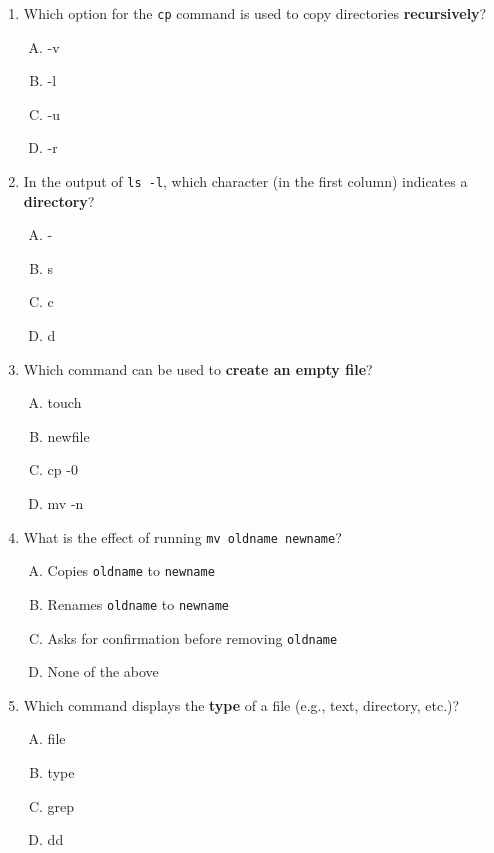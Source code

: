 \documentclass[a4paper]{report}
\begin{document}
\begin{enumerate}[1.]
    \item Which option for the \texttt{cp} command is used to copy directories \textbf{recursively}?  
    \begin{enumerate}[A)]
        \item -v  
        \item -l  
        \item -u  
        \item -r  
    \end{enumerate}

    \item In the output of \texttt{ls -l}, which character (in the first column) indicates a \textbf{directory}?  
    \begin{enumerate}[A)]
        \item -  
        \item s  
        \item c  
        \item d  
    \end{enumerate}

    \item Which command can be used to \textbf{create an empty file}?  
    \begin{enumerate}[A)]
        \item touch  
        \item newfile  
        \item cp -0  
        \item mv -n  
    \end{enumerate}

    \item What is the effect of running \texttt{mv oldname newname}?  
    \begin{enumerate}[A)]
        \item Copies \texttt{oldname} to \texttt{newname}  
        \item Renames \texttt{oldname} to \texttt{newname}  
        \item Asks for confirmation before removing \texttt{oldname}  
        \item None of the above  
    \end{enumerate}

    \item Which command displays the \textbf{type} of a file (e.g., text, directory, etc.)?  
    \begin{enumerate}[A)]
        \item file  
        \item type  
        \item grep  
        \item dd  
    \end{enumerate}


\end{enumerate}
\end{document}
